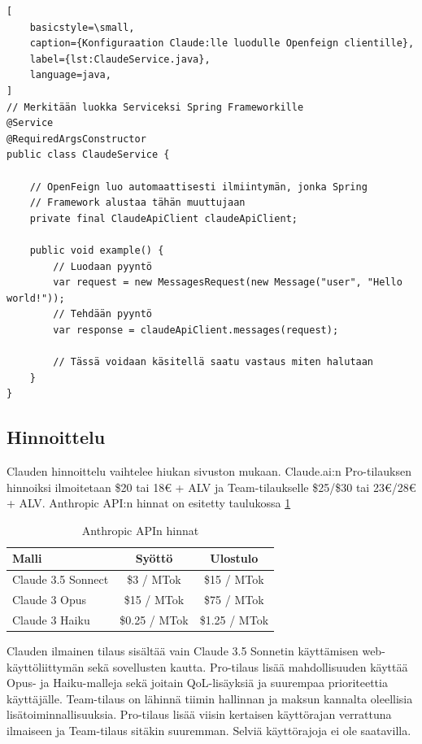 \begin{lstlisting}[
    basicstyle=\small,
    caption={Konfiguraation Claude:lle luodulle Openfeign clientille},
    label={lst:ClaudeService.java},
    language=java,
]
// Merkitään luokka Serviceksi Spring Frameworkille
@Service
@RequiredArgsConstructor
public class ClaudeService {

    // OpenFeign luo automaattisesti ilmiintymän, jonka Spring
    // Framework alustaa tähän muuttujaan
    private final ClaudeApiClient claudeApiClient;

    public void example() {
        // Luodaan pyyntö
        var request = new MessagesRequest(new Message("user", "Hello world!"));
        // Tehdään pyyntö
        var response = claudeApiClient.messages(request);

        // Tässä voidaan käsitellä saatu vastaus miten halutaan
    }
}
\end{lstlisting}

\subsection{Hinnoittelu}

Clauden hinnoittelu vaihtelee hiukan sivuston mukaan. Claude.ai:n Pro-tilauksen
hinnoiksi ilmoitetaan \$20 tai 18€ + ALV ja Team-tilaukselle \$25/\$30 tai
23€/28€ + ALV. \parencite{anthropicPricing} \parencite{claudePricing} Anthropic
API:n hinnat on esitetty taulukossa \ref{tab:anthropic-api-pricing}

\begin{table}[H]
  \centering
  \caption{Anthropic APIn hinnat}
  \label{tab:anthropic-api-pricing}
  \begin{tabular}{lcc}
    \textbf{Malli} & \textbf{Syöttö} & \textbf{Ulostulo} \\
    \hline
    Claude 3.5 Sonnect &    \$3 / MTok &   \$15 / MTok \\
    Claude 3 Opus      &   \$15 / MTok &   \$75 / MTok \\
    Claude 3 Haiku     & \$0.25 / MTok & \$1.25 / MTok \\
    \hline
  \end{tabular}
\end{table}

Clauden ilmainen tilaus sisältää vain Claude 3.5 Sonnetin käyttämisen web-
käyttöliittymän sekä sovellusten kautta. Pro-tilaus lisää mahdollisuuden
käyttää Opus- ja Haiku-malleja sekä joitain QoL-lisäyksiä ja suurempaa
prioriteettia käyttäjälle. Team-tilaus on lähinnä tiimin hallinnan ja maksun
kannalta oleellisia lisätoiminnallisuuksia. Pro-tilaus lisää viisin kertaisen
käyttörajan verrattuna ilmaiseen ja Team-tilaus sitäkin suuremman.
\parencite{anthropicPricing} \parencite{claudePricing} Selviä käyttörajoja ei
ole saatavilla.

